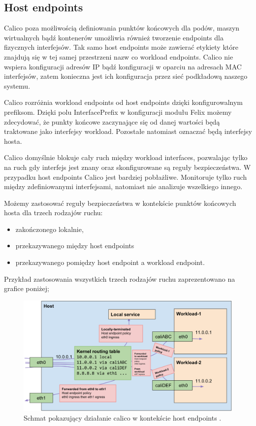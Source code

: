 \documentclass[pl,final,oneside]{mgr} %
\begin{document}
\subsection{Host endpoints}
Calico poza możliwością definiowania punktów końcowych dla podów, maszyn wirtualnych bądź kontenerów umożliwia również tworzenie endpoints dla fizycznych interfejsów. Tak samo host endpoints może zawierać etykiety które znajdują się w tej samej przestrzeni nazw co workload endpoints. Calico nie wspiera konfiguracji adresów IP bądź konfiguracji w oparciu na adresach MAC interfejsów, zatem konieczna jest ich konfiguracja przez sieć podkładową naszego systemu.

Calico rozróżnia workload endpoints od host endpoints dzięki konfigurowalnym prefiksom. Dzięki polu  InterfacePrefix w konfiguracji modułu Felix możemy zdecydować, że punkty końcowe zaczynające się od danej wartości będą traktowane jako interfejsy workload. Pozostałe natomiast oznaczać będą interfejsy hosta.

Calico domyślnie blokuje cały ruch między workload interfaces, pozwalając tylko na ruch gdy interfejs jest znany oraz skonfigurowane są reguły bezpieczeństwa. W przypadku host endpoints Calico jest bardziej pobłażliwe. Monitoruje tylko ruch między zdefiniowanymi interfejsami, natomiast nie analizuje wszelkiego innego.

Możemy zastosować reguły bezpieczeństwa w kontekście punktów końcowych hosta dla trzech rodzajów ruchu:
\begin{itemize}
	\item zakończonego lokalnie,
	\item przekazywanego między host endpoints
	\item przekazywanego pomiędzy host endpoint a workload endpoint.
\end{itemize}
Przykład zastosowania wszystkich trzech rodzajów ruchu zaprezentowano na grafice poniżej;

\begin{figure}[h!]
	\centering
	\includegraphics[width=1\linewidth]{images/bare-metal-packet-flows}
	\caption{Schmat pokazujący działanie calico w kontekście host endpoints \cite{calico_doku}.}
	\label{fig:bare-metal-packet-flows}
\end{figure}
\end{document}
